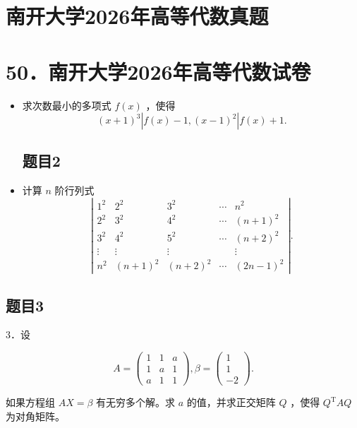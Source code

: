 \documentclass{article}
\begin{document}
\section*{南开大学2026年高等代数真题}
\section*{50．南开大学2026年高等代数试卷}
\begin{itemize}

\subsection{题目1}
  \item[1．] 求次数最小的多项式 \(f(x)\) ，使得
\[
(x+1)^{3}\left|f(x)-1,(x-1)^{2}\right| f(x)+1 .
\]

\subsection{题目2}
  \item[2．] 计算 \(n\) 阶行列式
\[
\left|\begin{array}{ccccc}
1^{2} & 2^{2} & 3^{2} & \cdots & n^{2} \\
2^{2} & 3^{2} & 4^{2} & \cdots & (n+1)^{2} \\
3^{2} & 4^{2} & 5^{2} & \cdots & (n+2)^{2} \\
\vdots & \vdots & \vdots & & \vdots \\
n^{2} & (n+1)^{2} & (n+2)^{2} & \cdots & (2 n-1)^{2}
\end{array}\right| .
\]
\end{itemize}

\subsection{题目3}
3．设

\[
A=\left(\begin{array}{lll}
1 & 1 & a \\
1 & a & 1 \\
a & 1 & 1
\end{array}\right), \beta=\left(\begin{array}{c}
1 \\
1 \\
-2
\end{array}\right) .
\]

如果方程组 \(A X=\beta\) 有无穷多个解。求 \(a\) 的值，并求正交矩阵 \(Q\) ，使得 \(Q^{\mathrm{T}} A Q\) 为对角矩阵。
\end{document}
